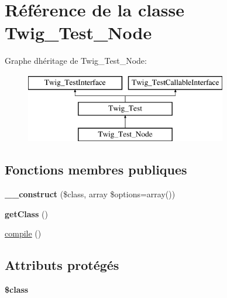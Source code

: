 \hypertarget{class_twig___test___node}{}\section{Référence de la classe Twig\+\_\+\+Test\+\_\+\+Node}
\label{class_twig___test___node}
Graphe d\textquotesingle{}héritage de Twig\+\_\+\+Test\+\_\+\+Node\+:\begin{figure}[H]
\begin{center}
\leavevmode
\includegraphics[height=3.000000cm]{class_twig___test___node}
\end{center}
\end{figure}
\subsection*{Fonctions membres publiques}
\begin{DoxyCompactItemize}
\item 
{\bfseries \+\_\+\+\_\+construct} (\$class, array \$options=array())\hypertarget{class_twig___test___node_ad54af67e0f4e88a0c80d60b51380a48e}{}\label{class_twig___test___node_ad54af67e0f4e88a0c80d60b51380a48e}

\item 
{\bfseries get\+Class} ()\hypertarget{class_twig___test___node_a23ecbde357f7f6bde5a50f876334a74d}{}\label{class_twig___test___node_a23ecbde357f7f6bde5a50f876334a74d}

\item 
\hyperlink{class_twig___test___node_a3815e7c2e73f00c2ebffcf5b90eef3b1}{compile} ()
\end{DoxyCompactItemize}
\subsection*{Attributs protégés}
\begin{DoxyCompactItemize}
\item 
{\bfseries \$class}\hypertarget{class_twig___test___node_a252ba022809910ea710a068fc1bab657}{}\label{class_twig___test___node_a252ba022809910ea710a068fc1bab657}

\end{DoxyCompactItemize}


